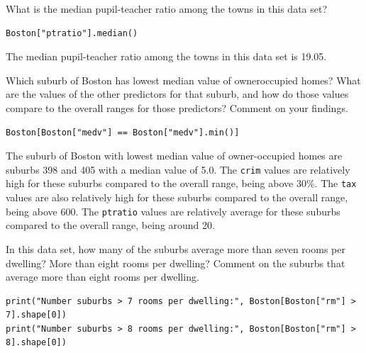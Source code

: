 \documentclass{article}
\begin{document}
\begin{probset}
\begin{prob}
\begin{subprobset}
        \begin{subprob}
            What is the median pupil-teacher ratio among the towns in this data set?

            \begin{verbatim}
Boston["ptratio"].median()
            \end{verbatim}

            \begin{soln}
                The median pupil-teacher ratio among the towns in this data set is 19.05.
            \end{soln}
        \end{subprob}

        \newpage

        \begin{subprob}
            Which suburb of Boston has lowest median value of owneroccupied homes? What are the values of the other predictors for that suburb, and how do those values compare to the overall ranges for those predictors? Comment on your findings.

            \begin{verbatim}
Boston[Boston["medv"] == Boston["medv"].min()]
            \end{verbatim}

            \begin{soln}
                The suburb of Boston with lowest median value of owner-occupied homes are suburbs 398 and 405 with a median value of 5.0. The \texttt{crim} values are relatively high for these suburbs compared to the overall range, being above 30\%. The \texttt{tax} values are also relatively high for these suburbs compared to the overall range, being above 600. The \texttt{ptratio} values are relatively average for these suburbs compared to the overall range, being around 20.
            \end{soln}
        \end{subprob}

        \begin{subprob}
            In this data set, how many of the suburbs average more than seven rooms per dwelling? More than eight rooms per dwelling? Comment on the suburbs that average more than eight rooms per dwelling.

            \begin{verbatim}
print("Number suburbs > 7 rooms per dwelling:", Boston[Boston["rm"] > 7].shape[0])
print("Number suburbs > 8 rooms per dwelling:", Boston[Boston["rm"] > 8].shape[0])


\end{verbatim}
\end{subprob}
\end{subprobset}
\end{prob}
\end{probset}
\end{document}
